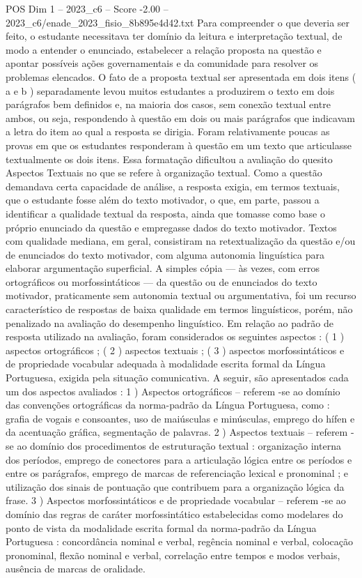 \begin{textsample}{POS Dim 1 – 2023\_c6 – Score -2.00 – 2023\_c6/enade\_2023\_fisio\_8b895e4d42.txt}
Para compreender o que deveria ser feito, o estudante necessitava ter domínio da leitura e interpretação textual, de modo a entender o enunciado, estabelecer a relação proposta na questão e apontar possíveis ações governamentais e da comunidade para resolver os problemas elencados.
O fato de a proposta textual ser apresentada em dois itens ( a e b ) separadamente levou muitos estudantes a produzirem o texto em dois parágrafos bem definidos e, na maioria dos casos, sem conexão textual entre ambos, ou seja, respondendo à questão em dois ou mais parágrafos que indicavam a letra do item ao qual a resposta se dirigia.
Foram relativamente poucas as provas em que os estudantes responderam à questão em um texto que articulasse textualmente os dois itens.
Essa formatação dificultou a avaliação do quesito Aspectos Textuais no que se refere à organização textual.
Como a questão demandava certa capacidade de análise, a resposta exigia, em termos textuais, que o estudante fosse além do texto motivador, o que, em parte, passou a identificar a qualidade textual da resposta, ainda que tomasse como base o próprio enunciado da questão e empregasse dados do texto motivador.
Textos com qualidade mediana, em geral, consistiram na retextualização da questão e/ou de enunciados do texto motivador, com alguma autonomia linguística para elaborar argumentação superficial.
A simples cópia — às vezes, com erros ortográficos ou morfossintáticos — da questão ou de enunciados do texto motivador, praticamente sem autonomia textual ou argumentativa, foi um recurso característico de respostas de baixa qualidade em termos linguísticos, porém, não penalizado na avaliação do desempenho linguístico.
Em relação ao padrão de resposta utilizado na avaliação, foram considerados os seguintes aspectos : ( 1 ) aspectos ortográficos ; ( 2 ) aspectos textuais ; ( 3 ) aspectos morfossintáticos e de propriedade vocabular adequada à modalidade escrita formal da Língua Portuguesa, exigida pela situação comunicativa.
A seguir, são apresentados cada um dos aspectos avaliados : 1 ) Aspectos ortográficos – referem -se ao domínio das convenções ortográficas da norma-padrão da Língua Portuguesa, como : grafia de vogais e consoantes, uso de maiúsculas e minúsculas, emprego do hífen e da acentuação gráfica, segmentação de palavras. 2 ) Aspectos textuais – referem -se ao domínio dos procedimentos de estruturação textual : organização interna dos períodos, emprego de conectores para a articulação lógica entre os períodos e entre os parágrafos, emprego de marcas de referenciação lexical e pronominal ; e utilização dos sinais de pontuação que contribuem para a organização lógica da frase. 3 ) Aspectos morfossintáticos e de propriedade vocabular – referem -se ao domínio das regras de caráter morfossintático estabelecidas como modelares do ponto de vista da modalidade escrita formal da norma-padrão da Língua Portuguesa : concordância nominal e verbal, regência nominal e verbal, colocação pronominal, flexão nominal e verbal, correlação entre tempos e modos verbais, ausência de marcas de oralidade.

\end{textsample}
